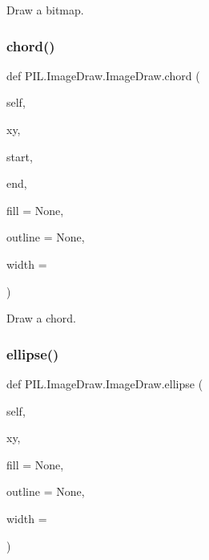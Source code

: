 \begin{DoxyVerb}Draw a bitmap.\end{DoxyVerb}
 \mbox{\label{classPIL_1_1ImageDraw_1_1ImageDraw_ab2a88c2f223d77130d450dda11773c27}} 
\subsubsection{\texorpdfstring{chord()}{chord()}}
{\footnotesize\ttfamily def P\+I\+L.\+Image\+Draw.\+Image\+Draw.\+chord (\begin{DoxyParamCaption}\item[{}]{self,  }\item[{}]{xy,  }\item[{}]{start,  }\item[{}]{end,  }\item[{}]{fill = {\ttfamily None},  }\item[{}]{outline = {\ttfamily None},  }\item[{}]{width = {} }\end{DoxyParamCaption})}

\begin{DoxyVerb}Draw a chord.\end{DoxyVerb}
 \mbox{\label{classPIL_1_1ImageDraw_1_1ImageDraw_aa3bb2ba492f17b92f7aedee6b4357ead}} 
\subsubsection{\texorpdfstring{ellipse()}{ellipse()}}
{\footnotesize\ttfamily def P\+I\+L.\+Image\+Draw.\+Image\+Draw.\+ellipse (\begin{DoxyParamCaption}\item[{}]{self,  }\item[{}]{xy,  }\item[{}]{fill = {\ttfamily None},  }\item[{}]{outline = {\ttfamily None},  }\item[{}]{width = {} }\end{DoxyParamCaption})}

